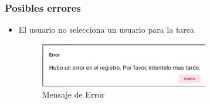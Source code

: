   \subsubsection{Posibles errores}

            \begin{itemize}
                \item El usuario no selecciona un usuario para la tarea
                \begin{figure}[H]
                \centering
                \hypertarget{error}{\includegraphics[width=0.7\linewidth]{images/Tareas/Error}}
                \caption{Mensaje de Error}
                \label{error}
            \end{figure}
            \end{itemize}


